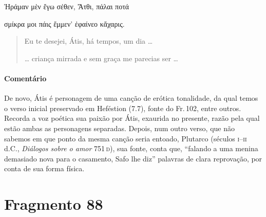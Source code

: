 \begin{gkverse}
Ἠράμαν μὲν ἔγω σέθεν, Ἄτθι, πάλαι ποτά

\hspace*{27mm}

σμίκρα μοι πάις ἔμμεν’ ἐφαίνεο κἄχαρις.
\end{gkverse}

\begin{verse}
Eu te desejei, Átis, há tempos, um dia \ldots{}

\hspace*{27mm}

\ldots{} criança mirrada e sem graça me parecias ser \ldots{}
\end{verse}

\medskip

{\paragraph{Comentário} De novo, Átis é personagem de uma canção de erótica tonalidade, da qual temos o verso inicial preservado em Heféstion (7.7), fonte do Fr.\,102, entre outros. Recorda a voz poética sua paixão por Átis, exaurida no presente, razão pela qual estão ambas as personagens separadas. Depois, num outro verso, que não sabemos em que ponto da mesma canção seria entoado, Plutarco (séculos \textsc{i}--\textsc{ii} d.C., \textit{Diálogos sobre o amor} 751\,\textsc{d}),
sua fonte, conta que, ``falando a uma menina demasiado nova para o
casamento, Safo lhe diz'' palavras de clara reprovação, por conta de sua forma
física. }



\pagebreak
\section{Fragmento 88}

